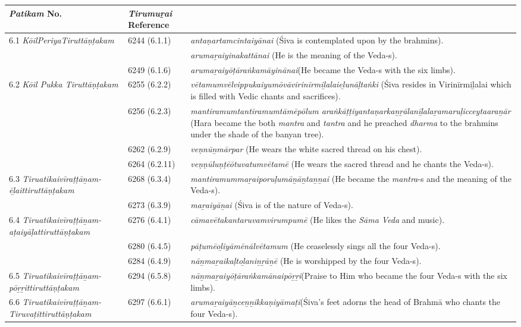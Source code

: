 \begin{longtable}{|m{2.7cm}|m{2.7cm}|>{\raggedright}m{3.1cm}|}
\hline
\multicolumn{1}{|m{2.5cm}}{\centering \textit{Patikam} No.} & \multicolumn{1}{|m{2.5cm}}{\centering \textit{Tirumuṟai} Reference} & \multicolumn{1}{|m{2.5cm}|}{\centering Text} \\
\hline
6.1 \textit{KōilPeriyaTiruttāṇṭakam} & 6244 (6.1.1) & \textit{antaṇartamcintaiyānai}  (Śiva is contemplated upon by the brahmins). \tabularnewline
\hline
 &  & \textit{arumaṟaiyinakattānai} (He is the meaning of the Veda-s). \tabularnewline
\hline
 & 6249 (6.1.6) & \textit{arumaṟaiyōṭāraṅkamā\-yinānai}(He became the Veda-s with the six limbs). \tabularnewline
\hline
6.2 \textit{Kōil Pukka Tiruttāṇṭakam} & 6255 (6.2.2) & \textit{vētamumvēlvippukai\-yumōvāvirinīrmiḻalai\-eḻunāḷtaṅki} (Śiva resides in Virinīrmiḻalai which is filled with Vedic chants and sacrifices). \tabularnewline
\hline
 & 6256 (6.2.3) & \textit{mantiramumtantira\-mumtāmēpōlum araṅkāṭṭiyantaṇarkaṉṟālanīḻalaṟamaruḷicceytaaraṉār} (Hara became the both \textit{mantra }\index{mantra@\textit{mantra}} and \textit{tantra}\index{tantra@\textit{tantra}} and he preached \textit{dharma} to the brahmins under the shade of the banyan tree). \tabularnewline
\hline
 & 6262 (6.2.9) & \textit{veṇnūṉmārpar} (He wears the white sacred thread on his chest). \tabularnewline
\hline
 & 6264 (6.2.11) & \textit{veṇṇūluṇṭēōtuvatum\-vētamē} (He wears the sacred thread\index{sacred thread} and he chants the Veda-s). \tabularnewline
\hline
6.3 \textit{Tiruatikaivīraṭṭāṉam-ēḻaittiruttāṇṭakam} & 6268 (6.3.4) & \textit{mantiramummaṟai\-poruḷumāṉāṉtaṉṉai} (He became the \textit{mantra}-s and the meaning of the Veda-s). \tabularnewline
\hline
 & 6273 (6.3.9) & \textit{maṟaiyāṉai} (Śiva is of the nature of Veda-s). \tabularnewline
\hline
6.4 \textit{Tiruatikaivīraṭṭā\-ṉam-aṭaiyāḷatti\-ruttāṇṭakam} & 6276 (6.4.1) & \textit{cāmavētakantaruvam\-virumpumē} (He likes the \textit{Sāma Veda} and music). \tabularnewline
\hline
 & 6280 (6.4.5) & \textit{pāṭumēoḻiyāmēnālvēta\-mum} (He ceaselessly sings all the four Veda-s). \tabularnewline
\hline
 & 6284 (6.4.9) & \textit{nāṉmaṟaikaḷtoḻaniṉṟāṉē} (He is worshipped by the four Veda-s). \tabularnewline
\hline
6.5 \textit{Tiruatikaivīra\-ṭṭāṉam-pōṟṟitti\-ruttāṇṭakam} & 6294 (6.5.8) & \textit{nāṉmaṟaiyōṭāraṅkamā\-naipōṟṟi}(Praise to Him who became the four Veda-s with the six limbs). \tabularnewline
\hline
6.6 \textit{Tiruatikaivīraṭṭāṉam-Tiruvaṭittiruttāṇ\-ṭakam} & 6297 (6.6.1) & \textit{arumaṟaiyāṉceṉṉikka\-ṇiyāmaṭi}(Śiva’s feet adorns the head of Brahmā\index{Brahma@Brahmā} who chants the four Veda-s). \tabularnewline

\end{longtable}
